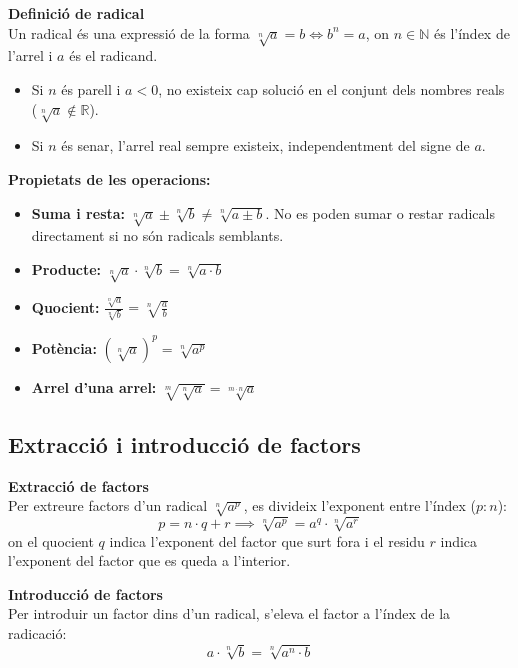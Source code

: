 \documentclass[12pt]{article}
\begin{document}
\begin{concept}
\textbf{Definició de radical}\\
Un radical és una expressió de la forma $\sqrt[n]{a} = b \iff b^n = a$, on $n \in \mathbb{N}$ és l'índex de l'arrel i $a$ és el radicand.
\begin{itemize}
    \item Si $n$ és parell i $a < 0$, no existeix cap solució en el conjunt dels nombres reals ($\sqrt[n]{a} \notin \mathbb{R}$).
    \item Si $n$ és senar, l'arrel real sempre existeix, independentment del signe de $a$.
\end{itemize}

\textbf{Propietats de les operacions:}
\begin{itemize}
    \item \textbf{Suma i resta:} $\sqrt[n]{a} \pm \sqrt[n]{b} \neq \sqrt[n]{a \pm b}$. No es poden sumar o restar radicals directament si no són radicals semblants.
    \item \textbf{Producte:} $\sqrt[n]{a} \cdot \sqrt[n]{b} = \sqrt[n]{a \cdot b}$
    \item \textbf{Quocient:} $\frac{\sqrt[n]{a}}{\sqrt[n]{b}} = \sqrt[n]{\frac{a}{b}}$
    \item \textbf{Potència:} $(\sqrt[n]{a})^p = \sqrt[n]{a^p}$
    \item \textbf{Arrel d'una arrel:} $\sqrt[m]{\sqrt[n]{a}} = \sqrt[m \cdot n]{a}$
\end{itemize}
\end{concept}

\subsection{Extracció i introducció de factors}

\begin{concept}
\textbf{Extracció de factors}\\
Per extreure factors d'un radical $\sqrt[n]{a^p}$, es divideix l'exponent entre l'índex ($p : n$):
\[ p = n \cdot q + r \implies \sqrt[n]{a^p} = a^q \cdot \sqrt[n]{a^r} \]
on el quocient $q$ indica l'exponent del factor que surt fora i el residu $r$ indica l'exponent del factor que es queda a l'interior.

\textbf{Introducció de factors}\\
Per introduir un factor dins d'un radical, s'eleva el factor a l'índex de la radicació:
\[ a \cdot \sqrt[n]{b} = \sqrt[n]{a^n \cdot b} \]
\end{concept}
\end{document}
